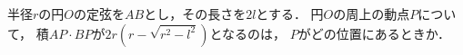 \documentclass[../../main.tex]{subfiles}
\begin{document}
半径$r$の円$O$の定弦を$AB$とし，その長さを$2l$とする．
円$O$の周上の動点$P$について，
積$AP \cdot BP$が$2r(r-\sqrt{r^2-l^2})$となるのは，
$P$がどの位置にあるときか．
\end{document}
